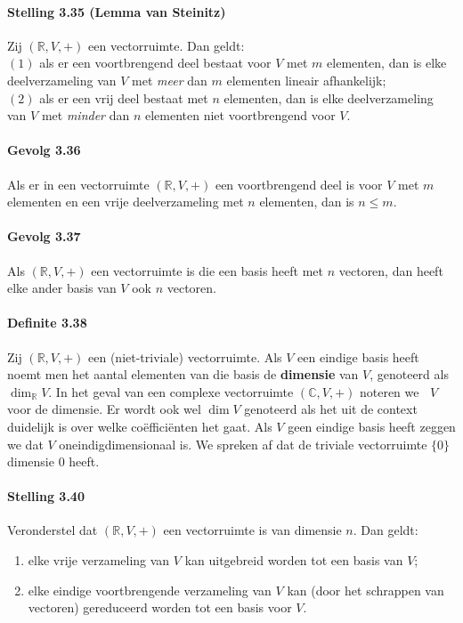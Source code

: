 \documentclass[11pt,oneside,a4paper]{article}
\DeclareMathOperator{\cdim}{dim_\mathbb{C}}
\begin{document}
	\paragraph{Stelling 3.35 (Lemma van Steinitz)}
		Zij $(\mathbb{R}, V, +)$ een vectorruimte. Dan geldt: \\
		$(1)$ als er een voortbrengend deel bestaat voor $V$ met $m$ elementen, dan is elke deelverzameling van $V$ met \textit{meer} dan $m$ elementen lineair afhankelijk; \\
		$(2)$ als er een vrij deel bestaat met $n$ elementen, dan is elke deelverzameling van $V$ met \textit{minder} dan $n$ elementen niet voortbrengend voor $V$.
	\paragraph{Gevolg 3.36}
		Als er in een vectorruimte $(\mathbb{R}, V, +)$ een voortbrengend deel is voor $V$ met $m$ elementen en een vrije deelverzameling met $n$ elementen, dan is $n \le m$.
	\paragraph{Gevolg 3.37}
		Als $(\mathbb{R}, V, +)$ een vectorruimte is die een basis heeft met $n$ vectoren, dan heeft elke ander basis van $V$ ook $n$ vectoren.
	\paragraph{Definite 3.38}
		Zij $(\mathbb{R}, V, +)$ een (niet-triviale) vectorruimte. Als $V$ een eindige basis heeft noemt men het aantal elementen van die basis de \textbf{dimensie} van $V$, genoteerd als $\dim_{\mathbb{R}}V$. In het geval van een complexe vectorruimte $(\mathbb{C}, V, +)$ noteren we $\cdim V$ voor de dimensie. Er wordt ook wel $\dim V$ genoteerd als het uit de context duidelijk is over welke coëfficiënten het gaat. Als $V$ geen eindige basis heeft zeggen we dat $V$ oneindigdimensionaal is. We spreken af dat de triviale vectorruimte $\{0\}$ dimensie $0$ heeft.
	\paragraph{Stelling 3.40}
		Veronderstel dat $(\mathbb{R}, V, +)$ een vectorruimte is van dimensie $n$. Dan geldt:
		\begin{enumerate}
			\item elke vrije verzameling van $V$ kan uitgebreid worden tot een basis van $V$;
			\item elke eindige voortbrengende verzameling van $V$ kan (door het schrappen van vectoren) gereduceerd worden tot een basis voor $V$.
		\end{enumerate}
\end{document}
